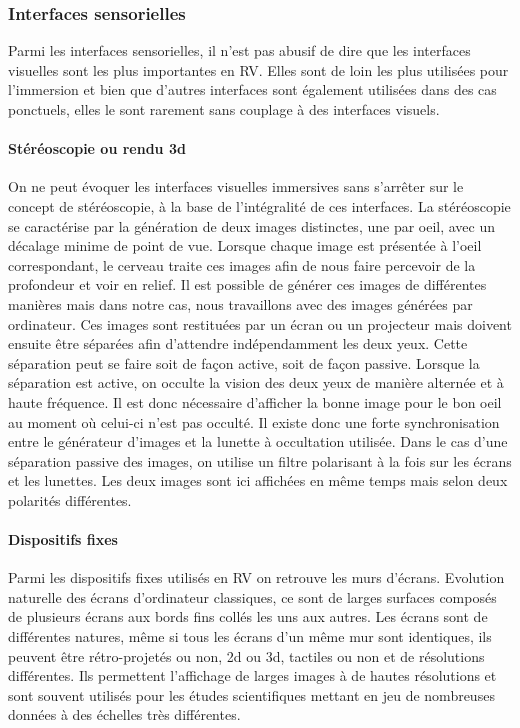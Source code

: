 \subsubsection{Interfaces sensorielles} \label{interface_sensor}

Parmi les interfaces sensorielles, il n'est pas abusif de dire que les interfaces visuelles sont les plus importantes en RV. Elles sont de loin les plus utilisées pour l'immersion et bien que d'autres interfaces sont également utilisées dans des cas ponctuels, elles le sont rarement sans couplage à des interfaces visuels.

\paragraph{Stéréoscopie ou rendu 3d}

On ne peut évoquer les interfaces visuelles immersives sans s'arrêter sur le concept de stéréoscopie, à la base de l'intégralité de ces interfaces. La stéréoscopie se caractérise par la génération de deux images distinctes, une par oeil, avec un décalage minime de point de vue. Lorsque chaque image est présentée à l'oeil correspondant, le cerveau traite ces images afin de nous faire percevoir de la profondeur et voir en relief. Il est possible de générer ces images de différentes manières mais dans notre cas, nous travaillons avec des images générées par ordinateur. Ces images sont restituées par un écran ou un projecteur mais doivent ensuite être séparées afin d'attendre indépendamment les deux yeux. Cette séparation peut se faire soit de façon active, soit de façon passive. Lorsque la séparation est active, on occulte la vision des deux yeux de manière alternée et à haute fréquence. Il est donc nécessaire d'afficher la bonne image pour le bon oeil au moment où celui-ci n'est pas occulté. Il existe donc une forte synchronisation entre le générateur d'images et la lunette à occultation utilisée.
Dans le cas d'une séparation passive des images, on utilise un filtre polarisant à la fois sur les écrans et les lunettes. Les deux images sont ici affichées en même temps mais selon deux polarités différentes.

\paragraph{Dispositifs fixes} \label{dispo_fix}

Parmi les dispositifs fixes utilisés en RV on retrouve les murs d'écrans. Evolution naturelle des écrans d'ordinateur classiques, ce sont de larges surfaces composés de plusieurs écrans aux bords fins collés les uns aux autres. Les écrans sont de différentes natures, même si tous les écrans d'un même mur sont identiques, ils peuvent être rétro-projetés ou non, 2d ou 3d, tactiles ou non et de résolutions différentes. Ils permettent l'affichage de larges images à de hautes résolutions et sont souvent utilisés pour les études scientifiques mettant en jeu de nombreuses données à des échelles très différentes.

